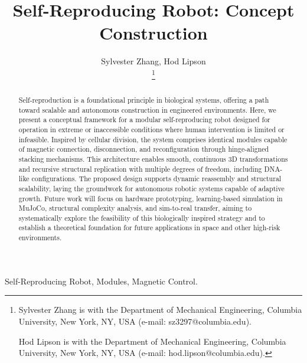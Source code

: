 \documentclass[lettersize,journal]{IEEEtran}
\begin{document}
\title{Self-Reproducing Robot: Concept Construction}

\author{Sylvester Zhang, Hod Lipson

\thanks{Sylvester Zhang is with the Department of Mechanical Engineering, Columbia University, New York, NY, USA (e-mail: sz3297@columbia.edu).

Hod Lipson is with the Department of Mechanical Engineering, Columbia University, New York, NY, USA (e-mail: hod.lipson@columbia.edu).}%
}


\maketitle

\begin{abstract}
Self-reproduction is a foundational principle in biological systems, offering a path toward scalable and autonomous construction in engineered environments. Here, we present a conceptual framework for a modular self-reproducing robot designed for operation in extreme or inaccessible conditions where human intervention is limited or infeasible. Inspired by cellular division, the system comprises identical modules capable of magnetic connection, disconnection, and reconfiguration through hinge-aligned stacking mechanisms. This architecture enables smooth, continuous 3D transformations and recursive structural replication with multiple degrees of freedom, including DNA-like configurations. The proposed design supports dynamic reassembly and structural scalability, laying the groundwork for autonomous robotic systems capable of adaptive growth. Future work will focus on hardware prototyping, learning-based simulation in MuJoCo, structural complexity analysis, and sim-to-real transfer, aiming to systematically explore the feasibility of this biologically inspired strategy and to establish a theoretical foundation for future applications in space and other high-risk environments.
\end{abstract}

\begin{IEEEkeywords}
Self-Reproducing Robot, Modules, Magnetic Control.
\end{IEEEkeywords}
\end{document}
